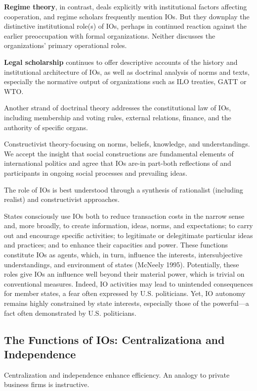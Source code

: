 \textbf{Regime theory}, in contrast, deals explicitly with institutional factors affecting cooperation, and regime scholars frequently mention IOs. But they downplay the distinctive institutional role(s) of IOs, perhaps in continued reaction against the earlier preoccupation with formal organizations. Neither discusses the organizations' primary operational roles.

\textbf{Legal scholarship} continues to offer descriptive accounts of the history and institutional architecture of IOs, as well as doctrinal analysis of norms and texts, especially the normative output of organizations such as ILO treaties, GATT or WTO.

Another strand of doctrinal theory addresses the constitutional law of IOs, including membership and voting rules, external relations, finance, and the authority of specific organs.

Constructivist theory-focusing on norms, beliefs, knowledge, and understandings. We accept the insight that social constructions are fundamental elements of international politics and agree that IOs are-in part-both reflections of and participants in ongoing social processes and prevailing ideas.

The role of IOs is best understood through a synthesis of rationalist (including realist) and constructivist approaches.

States consciously use IOs both to reduce transaction costs in the narrow sense and, more broadly, to create information, ideas, norms, and expectations; to carry out and encourage specific activities; to legitimate or delegitimate particular ideas and practices; and to enhance their capacities and power. These functions constitute IOs as agents, which, in turn, influence the interests, intersubjective understandings, and environment of states (McNeely 1995). Potentially, these roles give IOs an influence well beyond their material power, which is trivial on conventional measures. Indeed, IO activities may lead to unintended consequences for member states, a fear often expressed by U.S. politicians. Yet, IO autonomy remains highly constrained by state interests, especially those of the powerful—a fact often demonstrated by U.S. politicians.

\subsection{The Functions of IOs: Centralizationa and Independence}

Centralization and independence enhance efficiency. An analogy to private business firms is instructive.

